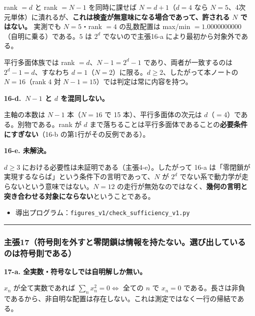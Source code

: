 \documentclass[
  10pt,
]{ltjsarticle}
\providecommand{\tightlist}{%
  \setlength{\itemsep}{0pt}\setlength{\parskip}{0pt}}
\begin{document}
rank \(= d\) と rank \(= N-1\) を同時に課せば \(N = d+1\)（\(d=4\) なら
\(N=5\)、4次元単体）に潰れるが、\textbf{これは検査が無意味になる場合であって、許される
\(N\) ではない。} 実測でも \(N=5\)・rank \(=4\) の乱数配置は max/min
\(= 1.0000000000\)（自明に乗る）である。\(5\) は \(2^d\)
でないので主張16-a により最初から対象外である。

平行多面体族では rank \(= d\)、\(N-1 = 2^d-1\)
であり、両者が一致するのは \(2^d - 1 = d\)、すなわち
\(d = 1\)（\(N=2\)）に限る。\(d \ge 2\)、したがって本ノートの
\(N = 16\)（rank 4 対 \(N-1 = 15\)）では判定は常に内容を持つ。

\textbf{16-d.~\(N-1\) と \(d\) を混同しない。}

主軸の本数は \(N-1\) 本（\(N=16\) で 15 本）、平行多面体の次元は
\(d\)（\(= 4\)）である。別物である。rank が \(d\)
まで落ちることは平行多面体であることの\textbf{必要条件にすぎない}（16-b
の第1行がその反例である）。

\textbf{16-e. 未解決。}

\(d \ge 3\) における必要性は未証明である（主張4-e）。したがって 16-a
は「零閉鎖が実現するならば」という条件下の言明であって、\(N\) が \(2^d\)
でない系で動力学が走らないという意味ではない。\(N = 12\)
の走行が無効なのではなく、\textbf{幾何の言明と突き合わせる対象にならない}ということである。

\begin{itemize}
\tightlist
\item
  導出プログラム：\texttt{figures\_v1/check\_sufficiency\_v1.py}
\end{itemize}

\begin{center}\rule{0.5\linewidth}{0.5pt}\end{center}

\subsubsection{主張17（符号則を外すと零閉鎖は情報を持たない。選び出しているのは符号則である）}\label{ux4e3bux5f3517ux7b26ux53f7ux5247ux3092ux5916ux3059ux3068ux96f6ux9589ux9396ux306fux60c5ux5831ux3092ux6301ux305fux306aux3044ux9078ux3073ux51faux3057ux3066ux3044ux308bux306eux306fux7b26ux53f7ux5247ux3067ux3042ux308b}

\textbf{17-a. 全実数・符号なしでは自明解しか無い。}

\(x_n\) が全て実数であれば \(\sum_n x_n^2 = 0 \Leftrightarrow\) 全ての
\(n\) で \(x_n = 0\)
である。長さは非負であるから、非自明な配置は存在しない。これは測定ではなく一行の帰結である。
\end{document}
